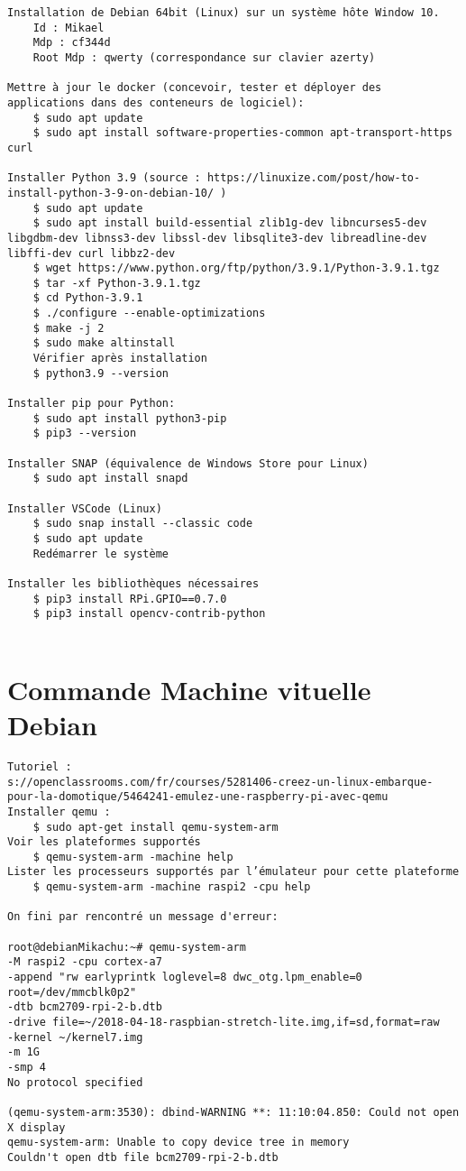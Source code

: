 \documentclass[a4paper]{report}
\begin{document}
    \begin{verbatim}
Installation de Debian 64bit (Linux) sur un système hôte Window 10.
    Id : Mikael
    Mdp : cf344d
    Root Mdp : qwerty (correspondance sur clavier azerty)

Mettre à jour le docker (concevoir, tester et déployer des applications dans des conteneurs de logiciel):
    $ sudo apt update
    $ sudo apt install software-properties-common apt-transport-https curl

Installer Python 3.9 (source : https://linuxize.com/post/how-to-install-python-3-9-on-debian-10/ )
    $ sudo apt update
    $ sudo apt install build-essential zlib1g-dev libncurses5-dev libgdbm-dev libnss3-dev libssl-dev libsqlite3-dev libreadline-dev libffi-dev curl libbz2-dev
    $ wget https://www.python.org/ftp/python/3.9.1/Python-3.9.1.tgz
    $ tar -xf Python-3.9.1.tgz
    $ cd Python-3.9.1
    $ ./configure --enable-optimizations
    $ make -j 2
    $ sudo make altinstall
    Vérifier après installation
    $ python3.9 --version

Installer pip pour Python:
    $ sudo apt install python3-pip
    $ pip3 --version

Installer SNAP (équivalence de Windows Store pour Linux)
    $ sudo apt install snapd

Installer VSCode (Linux)
    $ sudo snap install --classic code
    $ sudo apt update
    Redémarrer le système

Installer les bibliothèques nécessaires
    $ pip3 install RPi.GPIO==0.7.0
    $ pip3 install opencv-contrib-python
    
    \end{verbatim}

    \section{Commande Machine vituelle Debian} \label{sec:qmu}

    \begin{verbatim}
Tutoriel : 
s://openclassrooms.com/fr/courses/5281406-creez-un-linux-embarque-pour-la-domotique/5464241-emulez-une-raspberry-pi-avec-qemu 
Installer qemu : 
    $ sudo apt-get install qemu-system-arm
Voir les plateformes supportés
    $ qemu-system-arm -machine help
Lister les processeurs supportés par l’émulateur pour cette plateforme
    $ qemu-system-arm -machine raspi2 -cpu help

On fini par rencontré un message d'erreur:

root@debianMikachu:~# qemu-system-arm 
-M raspi2 -cpu cortex-a7 
-append "rw earlyprintk loglevel=8 dwc_otg.lpm_enable=0 root=/dev/mmcblk0p2" 
-dtb bcm2709-rpi-2-b.dtb 
-drive file=~/2018-04-18-raspbian-stretch-lite.img,if=sd,format=raw 
-kernel ~/kernel7.img 
-m 1G 
-smp 4
No protocol specified

(qemu-system-arm:3530): dbind-WARNING **: 11:10:04.850: Could not open X display
qemu-system-arm: Unable to copy device tree in memory
Couldn't open dtb file bcm2709-rpi-2-b.dtb
    
    \end{verbatim}
\end{document}
